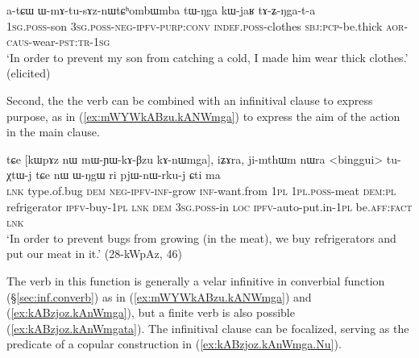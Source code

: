 \begin{exe}
\ex \label{ex:WmAtusAznWtChombWmba}
\gll  a-tɕɯ ɯ-mɤ-tu-sɤz-nɯtɕʰombɯ\redp{}mba tɯ-ŋga kɯ-jaʁ tɤ-ʑ-ŋga-t-a \\
\textsc{1sg}.\textsc{poss}-son \textsc{3sg}.\textsc{poss}-\textsc{neg}-\textsc{ipfv}-\textsc{purp}:\textsc{conv} \textsc{indef}.\textsc{poss}-clothes \textsc{sbj}:\textsc{pcp}-be.thick \textsc{aor}-\textsc{caus}-wear-\textsc{pst}:\textsc{tr}-\textsc{1sg} \\
\glt `In order to prevent my son from catching a cold, I made him wear thick clothes.' (elicited)
\end{exe}

Second, the  the verb   can be combined with an infinitival clause to express purpose, as in (\ref{ex:mWYWkABzu.kANWmga}) to express the aim of the action in the main clause. 


\begin{exe}
\ex \label{ex:mWYWkABzu.kANWmga}
\gll tɕe [kɯpɤz nɯ mɯ-ɲɯ-kɤ-βzu kɤ-nɯmga], iʑɤra, ji-mthɯm nɯra <binggui> tu-χtɯ-j tɕe nɯ ɯ-ŋgɯ ri pjɯ-nɯ-rku-j ɕti ma \\
\textsc{lnk} type.of.bug \textsc{dem} \textsc{neg}-\textsc{ipfv}-\textsc{inf}-grow \textsc{inf}-want.from \textsc{1pl} \textsc{1pl}.\textsc{poss}-meat \textsc{dem}:\textsc{pl} refrigerator  \textsc{ipfv}-buy-\textsc{1pl} \textsc{lnk} \textsc{dem} \textsc{3sg}.\textsc{poss}-in \textsc{loc} \textsc{ipfv}-auto-put.in-\textsc{1pl} be.\textsc{aff}:\textsc{fact} \textsc{lnk} \\
\glt `In order to prevent  bugs from growing (in the meat), we buy refrigerators and put our meat in it.' (28-kWpAz, 46)
\end{exe}

The verb  in this function is generally a velar infinitive   in converbial function (§\ref{sec:inf.converb}) as in (\ref{ex:mWYWkABzu.kANWmga}) and (\ref{ex:kABzjoz.kAnWmga}), but a finite verb is also possible (\ref{ex:kABzjoz.kAnWmgata}). The infinitival clause can be focalized, serving as the predicate of a copular construction in  (\ref{ex:kABzjoz.kAnWmga.Nu}).

